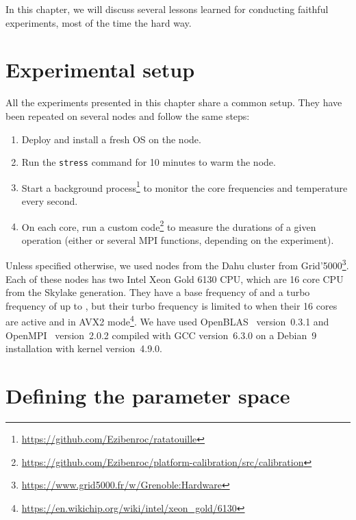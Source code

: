     In this chapter, we will discuss several lessons learned for conducting faithful experiments, most of the time the
    hard way.

    \section{Experimental setup}%
    \label{sec:experimental_setup}

        All the experiments presented in this chapter share a common setup. They have been repeated on several nodes and
        follow the same steps:
        \begin{enumerate}
            \item Deploy and install a fresh OS on the node.
            \item Run the \texttt{stress} command for 10 minutes to warm the node.
            \item Start a background process\footnote{\url{https://github.com/Ezibenroc/ratatouille}} to monitor the
                core frequencies and temperature every second.
            \item On each core, run a custom
                code\footnote{\url{https://github.com/Ezibenroc/platform-calibration/src/calibration}}
                to measure the durations of a given operation (either \dgemm or several MPI functions, depending
                on the experiment).
        \end{enumerate}

        Unless specified otherwise, we used nodes from the Dahu cluster from
        Grid'5000\footnote{\url{https://www.grid5000.fr/w/Grenoble:Hardware}}. Each of these nodes has two Intel Xeon
        Gold 6130 CPU, which are 16 core CPU from the Skylake generation. They have a base frequency of
         and a turbo frequency of up to , but their turbo frequency is
        limited to  when their 16 cores are active and in AVX2
        mode\footnote{\url{https://en.wikichip.org/wiki/intel/xeon\_gold/6130}}. We have used
        OpenBLAS~\cite{openblas} version~0.3.1 and OpenMPI~\cite{openmpi} version~2.0.2 compiled with GCC version~6.3.0
        on a Debian~9 installation with kernel version~4.9.0.

    \section{Defining the parameter space}%
    \label{sec:parameter_space}

